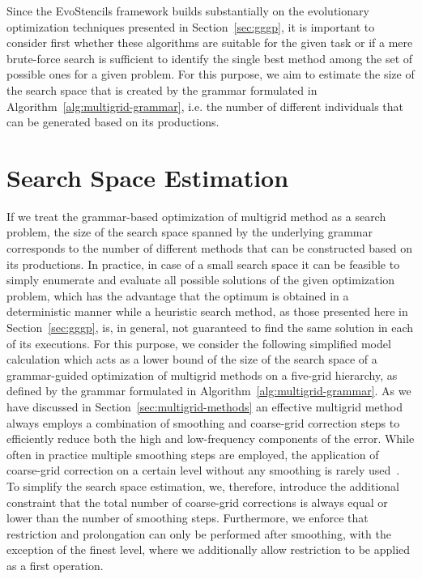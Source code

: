 Since the EvoStencils framework builds substantially on the evolutionary optimization techniques presented in Section~\ref{sec:gggp}, it is important to consider first whether these algorithms are suitable for the given task or if a mere brute-force search is sufficient to identify the single best method among the set of possible ones for a given problem.
For this purpose, we aim to estimate the size of the search space that is created by the grammar formulated in Algorithm~\ref{alg:multigrid-grammar}, i.e. the number of different individuals that can be generated based on its productions.

\section{Search Space Estimation}
If we treat the grammar-based optimization of multigrid method as a search problem, the size of the search space spanned by the underlying grammar corresponds to the number of different methods that can be constructed based on its productions.
In practice, in case of a small search space it can be feasible to simply enumerate and evaluate all possible solutions of the given optimization problem, which has the advantage that the optimum is obtained in a deterministic manner while a heuristic search method, as those presented here in Section~\ref{sec:gggp}, is, in general, not guaranteed to find the same solution in each of its executions.
For this purpose, we consider the following simplified model calculation which acts as a lower bound of the size of the search space of a grammar-guided optimization of multigrid methods on a five-grid hierarchy, as defined by the grammar formulated in Algorithm~\ref{alg:multigrid-grammar}. 
As we have discussed in Section~\ref{sec:multigrid-methods} an effective multigrid method always employs a combination of smoothing and coarse-grid correction steps to efficiently reduce both the high and low-frequency components of the error.
While often in practice multiple smoothing steps are employed, the application of coarse-grid correction on a certain level without any smoothing is rarely used~\cite{trottenberg2000multigrid}.
To simplify the search space estimation, we, therefore, introduce the additional constraint that the total number of coarse-grid corrections is always equal or lower than the number of smoothing steps.
Furthermore, we enforce that restriction and prolongation can only be performed after smoothing, with the exception of the finest level, where we additionally allow restriction to be applied as a first operation.
